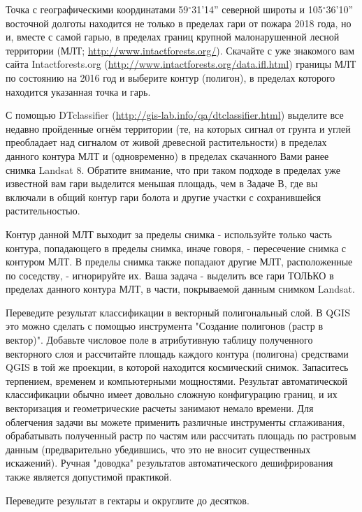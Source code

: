 
Точка с географическими координатами 59$^{\circ}$31'14'' северной широты и 105$^{\circ}$36'10'' восточной 
долготы находится не только в пределах гари от пожара 2018 года, но и, вместе с самой гарью, 
в пределах границ крупной малонарушенной лесной территории (МЛТ; \url{http://www.intactforests.org/}). Скачайте 
с уже знакомого вам сайта Intactforests.org (\url{http://www.intactforests.org/data.ifl.html}) границы МЛТ по состоянию на 2016 год и выберите контур (полигон), в пределах которого находится указанная точка и гарь.

С помощью DTclassifier (\url{http://gis-lab.info/qa/dtclassifier.html}) выделите все недавно пройденные огнём территории (те, на которых сигнал от грунта и углей преобладает над сигналом от живой древесной растительности) в пределах данного контура МЛТ и (одновременно) в пределах скачанного Вами ранее снимка Landsat 8. Обратите внимание, что при таком подходе в пределах уже известной вам гари выделится меньшая площадь, чем в Задаче В, где вы включали в общий контур гари болота и другие участки с сохранившейся растительностью.

Контур данной МЛТ выходит за пределы снимка - используйте только часть контура, попадающего в пределы снимка, иначе говоря, - пересечение снимка с контуром МЛТ. В пределы снимка также попадают другие МЛТ, расположенные по соседству, - игнорируйте их. Ваша задача - выделить все гари ТОЛЬКО в пределах данного контура МЛТ, в части, покрываемой данным снимком Landsat.

Переведите результат классификации в векторный полигональный слой. В QGIS это можно сделать с помощью инструмента "Создание полигонов (растр в вектор)". Добавьте числовое поле в атрибутивную таблицу полученного векторного слоя и рассчитайте площадь каждого контура (полигона) средствами QGIS в той же проекции, в которой находится космический снимок. Запаситесь терпением, временем и компьютерными мощностями. Результат автоматической классификации обычно имеет довольно сложную конфигурацию границ, и их векторизация и геометрические расчеты занимают немало времени. Для облегчения задачи вы можете применить различные инструменты сглаживания, обрабатывать полученный растр по частям или рассчитать площадь по растровым данным (предварительно убедившись, что это не вносит существенных искажений). Ручная "доводка" результатов автоматического дешифрирования также является допустимой практикой.

Переведите результат в гектары и округлите до десятков.